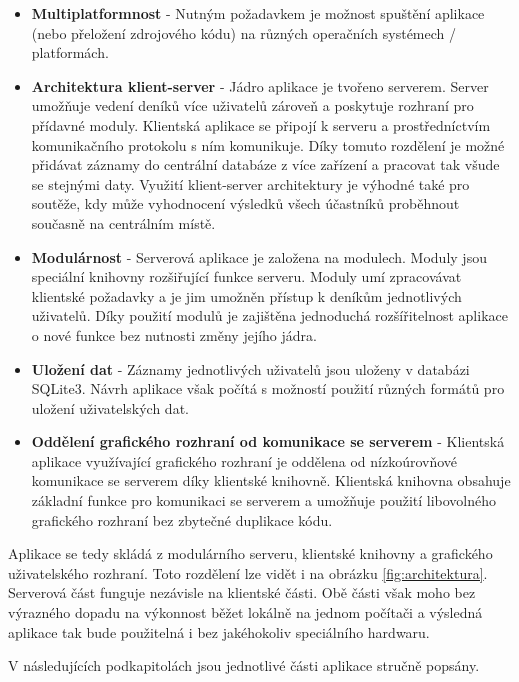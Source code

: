 \begin{itemize}
\item \textbf{Multiplatformnost} - Nutným požadavkem je možnost spuštění
aplikace (nebo přeložení zdrojového kódu) na různých operačních systémech / platformách.
\item \textbf{Architektura klient-server} - Jádro aplikace je tvořeno serverem.
Server umožňuje vedení deníků více uživatelů zároveň a poskytuje rozhraní pro přídavné moduly.
Klientská aplikace se připojí k serveru a prostředníctvím komunikačního protokolu s ním komunikuje.
Díky tomuto rozdělení je možné přidávat záznamy do centrální databáze z více zařízení a pracovat
tak všude se stejnými daty. Využití klient-server architektury je výhodné také pro soutěže, kdy může vyhodnocení
výsledků všech účastníků proběhnout současně na centrálním místě.
\item \textbf{Modulárnost} - Serverová aplikace je založena na modulech. Moduly jsou speciální knihovny rozšiřující funkce
serveru. Moduly umí zpracovávat klientské požadavky a je jim umožněn přístup k deníkům jednotlivých uživatelů. Díky použití modulů
je zajištěna jednoduchá rozšířitelnost aplikace o nové funkce bez nutnosti změny jejího jádra.
\item \textbf{Uložení dat} - Záznamy jednotlivých uživatelů jsou uloženy v databázi SQLite3. Návrh aplikace
však počítá s možností použití různých formátů pro uložení uživatelských dat.
\item \textbf{Oddělení grafického rozhraní od komunikace se serverem} - Klientská aplikace využívající grafického rozhraní
je oddělena od nízkoúrovňové komunikace se serverem díky klientské knihovně. Klientská knihovna obsahuje základní funkce
pro komunikaci se serverem a umožňuje použití libovolného grafického rozhraní bez zbytečné duplikace kódu.
\end{itemize}

Aplikace se tedy skládá z modulárního serveru, klientské knihovny a grafického uživatelského rozhraní.
Toto rozdělení lze vidět i na obrázku \ref{fig:architektura}.
Serverová část funguje nezávisle na klientské části. Obě části však moho bez výrazného dopadu 
na výkonnost běžet lokálně na jednom počítači a výsledná aplikace tak bude použitelná i bez
jakéhokoliv speciálního hardwaru.

V následujících podkapitolách jsou jednotlivé části aplikace stručně popsány.

